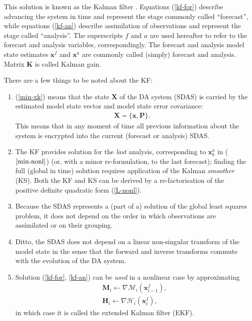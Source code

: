 \documentclass[11pt]{report}
\newcommand{\mb} {\mathbf}
\begin{document}
This solution is known as the Kalman filter \citep[KF,][]{kal60}.
Equations (\ref{kf-for}) describe advancing the system in time and represent the stage commonly called ``forecast'', while equations (\ref{kf-an}) describe assimilation of observations and represent the stage called ``analysis''.
The superscripts $f$ and $a$ are used hereafter to refer to the forecast and analysis variables, correspondingly.
The forecast and analysis model state estimates $\mb x^f$ and $\mb x^a$ are commonly called (simply) forecast and analysis.
Matrix $\mb K$ is called Kalman gain.

There are a few things to be noted about the KF:
\begin{enumerate}
\item (\ref{min-xk}) means that the state $\mb X$ of the DA system (SDAS) is carried by the estimated model state vector and model state error covariance: 
\begin{align}
  \label{sdas}
  \mb X = \{\mb x, \mb P\}.
\end{align}
This means that in any moment of time all previous information about the system is encrypted into the current (forecast or analysis) SDAS.
\item The KF provides solution for the \emph{last} analysis, corresponding to $\mb x_k^a$ in ($\ref{min-nonl}$) (or, with a minor re-formulation, to the last forecast); finding the full (global in time) solution requires application of the Kalman \emph{smoother} (KS).
Both the KF and KS can be derived by a re-factorisation of the positive definite quadratic form (\ref{L-nonl}).
\item Because the SDAS represents a (part of a) solution of the global least squares problem, it does not depend on the order in which observations are assimilated or on their grouping.
\item Ditto, the SDAS does not depend on a linear non-singular transform of the model state in the sense that the forward and inverse transforms commute with the evolution of the DA system.
\item Solution (\ref{kf-for}, \ref{kf-an}) can be \emph{used} in a nonlinear case by approximating
\begin{align*}
  &\mb M_{i} \leftarrow \nabla \mathcal M_i(\mb x_{i-1}^f),\\
  &\mb H_{i} \leftarrow \nabla \mathcal H_i(\mb x_i^f),
\end{align*}
in which case it is called the extended Kalman filter (EKF).
\end{enumerate}
\end{document}

